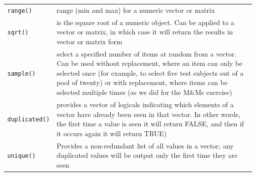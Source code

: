 \documentclass[a4paper]{book}
\begin{document}
\begin{longtable}[]{@{}ll@{}}
\begin{minipage}[t]{0.14\columnwidth}
\texttt{range()}\strut
\end{minipage} & \begin{minipage}[t]{0.80\columnwidth}\raggedright\strut
range (min and max) for a numeric vector or matrix\strut
\end{minipage}\tabularnewline
\begin{minipage}[t]{0.14\columnwidth}\raggedright\strut
\texttt{sqrt()}\strut
\end{minipage} & \begin{minipage}[t]{0.80\columnwidth}\raggedright\strut
is the square root of a numeric object. Can be applied to a vector or
matrix, in which case it will return the results in vector or matrix
form\strut
\end{minipage}\tabularnewline
\begin{minipage}[t]{0.14\columnwidth}\raggedright\strut
\texttt{sample()}\strut
\end{minipage} & \begin{minipage}[t]{0.80\columnwidth}\raggedright\strut
select a specified number of items at random from a vector. Can be used
without replacement, where an item can only be selected once (for
example, to select five test subjects out of a pool of twenty) or with
replacement, where items can be selected multiple times (as we did for
the M\&Ms exercise)\strut
\end{minipage}\tabularnewline
\begin{minipage}[t]{0.14\columnwidth}\raggedright\strut
\texttt{duplicated()}\strut
\end{minipage} & \begin{minipage}[t]{0.80\columnwidth}\raggedright\strut
provides a vector of logicals indicating which elements of a vector have
already been seen in that vector. In other words, the first time a value
is seen it will return FALSE, and then if it occurs again it will return
TRUE)\strut
\end{minipage}\tabularnewline
\begin{minipage}[t]{0.14\columnwidth}\raggedright\strut
\texttt{unique()}\strut
\end{minipage} & \begin{minipage}[t]{0.80\columnwidth}\raggedright\strut
Provides a non-redundant list of all values in a vector; any duplicated
values will be output only the first time they are seen\strut
\end{minipage}\tabularnewline
\bottomrule
\end{longtable}
\end{document}
